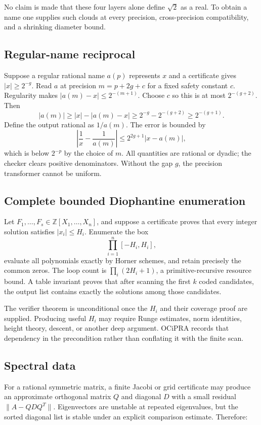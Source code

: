 No claim is made that these four layers alone define $\sqrt2$ as a real.  To obtain a name one supplies such clouds at every precision, cross-precision compatibility, and a shrinking diameter bound.

\subsection{Regular-name reciprocal}

Suppose a regular rational name $a(p)$ represents $x$ and a certificate gives $|x|\geq2^{-g}$.  Read $a$ at precision $m=p+2g+c$ for a fixed safety constant $c$.  Regularity makes
$|a(m)-x|\leq2^{-(m+1)}$.  Choose $c$ so this is at most $2^{-(g+2)}$.  Then
\[
 |a(m)|\geq |x|-|a(m)-x|
          \geq 2^{-g}-2^{-(g+2)}
          \geq 2^{-(g+1)}.
\]
Define the output rational as $1/a(m)$.  The error is bounded by
\[
 \left|\frac1x-\frac1{a(m)}\right|
 \leq 2^{2g+1}|x-a(m)|,
\]
which is below $2^{-p}$ by the choice of $m$.  All quantities are rational or dyadic; the checker clears positive denominators.  Without the gap $g$, the precision transformer cannot be uniform.

\subsection{Complete bounded Diophantine enumeration}

Let $F_1,\ldots,F_s\in\mathbb Z[X_1,\ldots,X_n]$, and suppose a certificate proves that every integer solution satisfies $|x_i|\leq H_i$.  Enumerate the box
\[
  \prod_{i=1}^n[-H_i,H_i],
\]
evaluate all polynomials exactly by Horner schemes, and retain precisely the common zeros.  The loop count is
$\prod_i(2H_i+1)$, a primitive-recursive resource bound.  A table invariant proves that after scanning the first $k$ coded candidates, the output list contains exactly the solutions among those candidates.

The verifier theorem is unconditional once the $H_i$ and their coverage proof are supplied.  Producing useful $H_i$ may require Runge estimates, norm identities, height theory, descent, or another deep argument.  OCiPRA records that dependency in the precondition rather than conflating it with the finite scan.

\subsection{Spectral data}

For a rational symmetric matrix, a finite Jacobi or grid certificate may produce an approximate orthogonal matrix $Q$ and diagonal $D$ with a small residual
$\|A-QDQ^T\|$.  Eigenvectors are unstable at repeated eigenvalues, but the sorted diagonal list is stable under an explicit comparison estimate.  Therefore:

